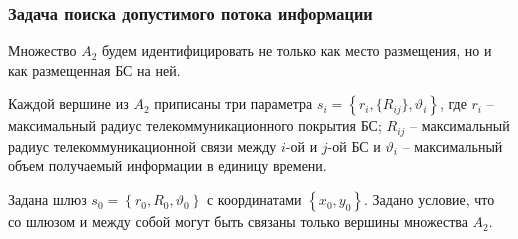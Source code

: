 \begin{frame}
    \frametitle{Задача поиска допустимого потока информации}
    \fontsize{10pt}{7.2}\selectfont
    \justifying

    \bigskip


    Множество $A_2$ будем идентифицировать не только как место размещения, но и как размещенная БС на ней.
    
    \bigskip
    
    Каждой вершине из $A_2$ приписаны три параметра $s_i = \left\{ r_i, \{R_{ij}\},\vartheta_i \right\}$, где $r_i$ -- максимальный радиус телекоммуникационного покрытия БС; $R_{ij}$ -- максимальный радиус телекоммуникационной связи между $i$-ой и $j$-ой БС и $\vartheta_i$ -- максимальный объем получаемый информации в единицу времени. 
    
    \bigskip
    
    Задана шлюз $s_0 = \left\{ r_0, R_0, \vartheta_0 \right\} $ с координатами $\left\{x_0, y_0 \right\}$. Задано условие, что со шлюзом и между собой могут быть связаны только вершины множества $A_2$.

\end{frame}


